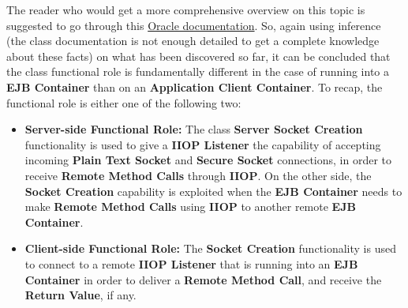 The reader who would get a more comprehensive overview on this topic is suggested to go through this \href{https://docs.oracle.com/javaee/7/firstcup/java-ee002.htm}{Oracle documentation}.
So, again using inference (the class documentation is not enough detailed to get a complete knowledge about these facts) on what has been discovered so far, it can be concluded that the class functional role is fundamentally different in the case of running into a \textbf{EJB Container} than on an \textbf{Application Client Container}.
To recap, the functional role is either one of the following two:
\begin{itemize}
	\item \textbf{Server-side Functional Role:}
		The class \textbf{Server Socket Creation} functionality is used to give a \textbf{IIOP Listener} the capability of accepting incoming \textbf{Plain Text Socket} and \textbf{Secure Socket} connections, in order to receive \textbf{Remote Method Calls} through \textbf{IIOP}.
		On the other side, the \textbf{Socket Creation} capability is exploited when the \textbf{EJB Container} needs to make \textbf{Remote Method Calls} using \textbf{IIOP} to another remote \textbf{EJB Container}.
	\item \textbf{Client-side Functional Role:}
		The \textbf{Socket Creation} functionality is used to connect to a remote \textbf{IIOP Listener} that is running into an \textbf{EJB Container} in order to deliver a \textbf{Remote Method Call}, and receive the \textbf{Return Value}, if any.
\end{itemize}

